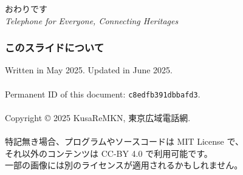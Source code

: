 \documentclass[
  lualatex,
  aspectratio=169,
  14pt
]{beamer}
\begin{document}
\begin{frame}[standout]
  おわりです\\[3\baselineskip]
  {\small\mdseries \textit{Telephone for Everyone, Connecting Heritages}}
  \\[-4\baselineskip]
\end{frame}

\begin{frame}
  \frametitle{このスライドについて}

  Written in May 2025.
  Updated in June 2025.
  \\~\\[-.5\baselineskip]

  Permanent ID of this document: \texttt{c8edfb391dbbafd3}.
  \\~\\[-.5\baselineskip]

  Copyright © 2025 KusaReMKN, 東京広域電話網.
  \\~\\[-.5\baselineskip]

  特記無き場合、プログラムやソースコードは MIT License で、\\
  \hspace{1.5\zw}それ以外のコンテンツは CC-BY 4.0 で利用可能です。\\
  \hspace{1.5\zw}一部の画像には別のライセンスが適用されるかもしれません。
\end{frame}
\end{document}
